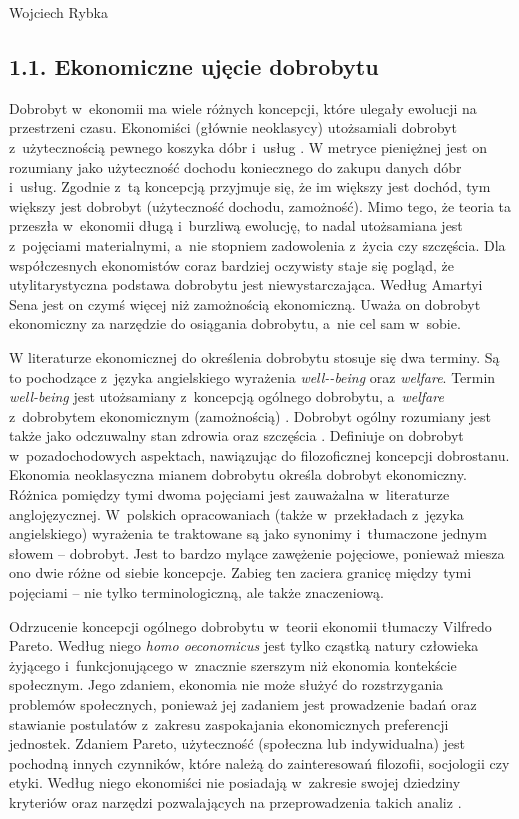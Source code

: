 \begin{artplenv}{Wojciech Rybka}
\subsection{1.1. Ekonomiczne ujęcie dobrobytu}
Dobrobyt w~ekonomii ma wiele różnych koncepcji, które ulegały ewolucji na przestrzeni czasu. Ekonomiści (głównie
neoklasycy) utożsamiali dobrobyt z~użytecznością pewnego koszyka dóbr i~usług
\parencite{kot_dobrobyt_2004}.
W metryce pieniężnej jest on rozumiany jako użyteczność dochodu koniecznego do zakupu danych dóbr i~usług.
Zgodnie z~tą koncepcją przyjmuje się, że im większy jest dochód, tym większy jest dobrobyt (użyteczność dochodu,
zamożność). Mimo tego, że teoria ta przeszła w~ekonomii długą  i~burzliwą ewolucję, to nadal utożsamiana
jest z~pojęciami materialnymi, a~nie stopniem zadowolenia z~życia czy szczęścia. Dla współczesnych ekonomistów coraz bardziej
oczywisty staje się pogląd, że utylitarystyczna podstawa dobrobytu jest niewystarczająca. Według Amartyi Sena jest on
czymś więcej niż zamożnością ekonomiczną. Uważa on dobrobyt ekonomiczny za narzędzie do osiągania dobrobytu, a~nie cel
sam w~sobie. 

W literaturze ekonomicznej do określenia dobrobytu stosuje się dwa terminy. Są to pochodzące z~języka angielskiego
wyrażenia \textit{well-\mbox{-being}} oraz \textit{welfare}. Termin \textit{well-being} jest utożsamiany z~koncepcją ogólnego
dobrobytu, a~\textit{welfare} z~dobrobytem ekonomicznym (zamożnością)
\parencite{kot_dobrobyt_2004}.
Dobrobyt ogólny rozumiany jest także jako odczuwalny stan zdrowia oraz szczęścia
\parencite{noauthor_well-being_2019}.
Definiuje on dobrobyt w~pozadochodowych aspektach, nawiązując do filozoficznej koncepcji dobrostanu. Ekonomia
neoklasyczna mianem dobrobytu określa dobrobyt ekonomiczny. Różnica pomiędzy tymi dwoma pojęciami jest
zauważalna w~literaturze anglojęzycznej. W~polskich opracowaniach (także w~przekładach z~języka angielskiego) wyrażenia te
traktowane są jako synonimy  i~tłumaczone jednym słowem -- dobrobyt. Jest to bardzo mylące zawężenie pojęciowe, ponieważ
miesza ono dwie różne od siebie koncepcje. Zabieg ten zaciera granicę między tymi pojęciami -- nie tylko terminologiczną,
ale także znaczeniową.

Odrzucenie koncepcji ogólnego dobrobytu w~teorii ekonomii tłumaczy Vilfredo Pareto. Według niego \textit{homo
oeconomicus} jest tylko cząstką natury człowieka żyjącego  i~funkcjonującego w~znacznie szerszym niż ekonomia
kontekście społecznym. Jego zdaniem, ekonomia nie może służyć do rozstrzygania problemów społecznych, ponieważ jej
zadaniem jest prowadzenie badań oraz stawianie postulatów z~zakresu zaspokajania ekonomicznych preferencji jednostek.
Zdaniem Pareto, użyteczność (społeczna lub indywidualna) jest pochodną innych czynników, które należą do zainteresowań
filozofii, socjologii czy etyki. Według niego ekonomiści nie posiadają w~zakresie swojej dziedziny kryteriów oraz
narzędzi pozwalających na przeprowadzenia takich analiz
\parencite{czech_ekonomia_2014}.


\end{artplenv}
